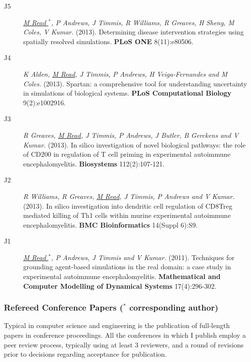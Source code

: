 \documentclass[a4paper]{article}
\begin{document}
\begin{description}
\item[J5]
\textit{\underline{M Read $^{*}$}, P Andrews, J Timmis, R Williams, R Greaves, H Sheng, M Coles, V Kumar.}
(2013).
Determining disease intervention strategies using spatially resolved simulations.
\textbf{PLoS ONE} 8(11):e80506.

\item[J4]
\textit{K Alden, \underline{M Read}, J Timmis, P Andrews, H Veiga-Fernandes and M Coles.}
(2013).
Spartan: a comprehensive tool for understanding uncertainty in simulations of biological systems.
\textbf{PLoS Computational Biology} 9(2):e1002916.

\item[J3]
\textit{R Greaves, \underline{M Read}, J Timmis, P Andrews, J Butler, B Gerckens and V Kumar.}
(2013).
In silico investigation of novel biological pathways: the role of CD200 in regulation of T cell priming in experimental autoimmune encephalomyelitis.
\textbf{Biosystems} 112(2):107-121.

\item[J2]
\textit{R Williams, R Greaves, \underline{M Read}, J Timmis, P Andrews and V Kumar.}
(2013).
In silico investigation into dendritic cell regulation of CD8Treg mediated killing of Th1 cells within murine experimental autoimmune encephalomyelitis.
\textbf{BMC Bioinformatics} 14(Suppl 6):S9.

\item[J1]
\textit{\underline{M Read $^{*}$}, P Andrews, J Timmis and V Kumar.}
(2011).
Techniques for grounding agent-based simulations in the real domain: a case study in experimental autoimmune encephalomyelitis.
\textbf{Mathematical and Computer Modelling of Dynamical Systems} 17(4):296-302.
\end{description}


\subsubsection*{Refereed Conference Papers ($^{*}$ corresponding author)}

Typical in computer science and engineering is the publication of full-length papers in conference proceedings. All the conferences in which I publish employ a peer review process, typically using at least 3 reviewers, and a round of revisions prior to decisions regarding acceptance for publication.
\end{document}
